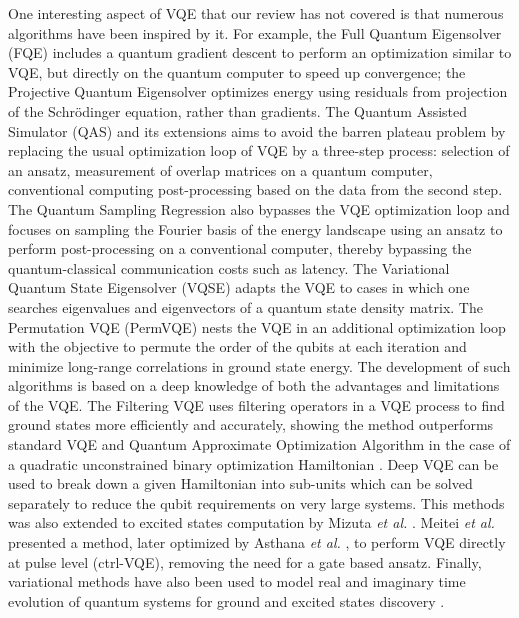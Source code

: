 \documentclass[a4paper,fleqn]{cas-sc}
\begin{document}
One interesting aspect of VQE that our review has not covered is that numerous algorithms have been inspired by it. For example, the Full Quantum Eigensolver \cite{Wei2020} (FQE) includes a quantum gradient descent to perform an optimization similar to VQE, but directly on the quantum computer to speed up convergence; the Projective Quantum Eigensolver \cite{Stair2021} optimizes energy using residuals from projection of the Schr\"odinger equation, rather than gradients. The Quantum Assisted Simulator (QAS) \cite{Bharti2020, Haug2020} and its extensions \cite{Bharti2020_IQAE} aims to avoid the barren plateau problem by replacing the usual optimization loop of VQE by a three-step process: selection of an ansatz, measurement of overlap matrices on a quantum computer, conventional computing post-processing based on the data from the second step. The Quantum Sampling Regression \cite{Rivero2020} also bypasses the VQE optimization loop and focuses on sampling the Fourier basis of the energy landscape using an ansatz to perform post-processing on a conventional computer, thereby bypassing the quantum-classical communication costs such as latency. The Variational Quantum State Eigensolver (VQSE) \cite{Cerezo2020_VQSE} adapts the VQE to cases in which one searches eigenvalues and eigenvectors of a quantum state density matrix. The Permutation VQE (PermVQE) \cite{Tkachenko2021} nests the VQE in an additional optimization loop with the objective to permute the order of the qubits at each iteration and minimize long-range correlations in ground state energy. The development of such algorithms is based on a deep knowledge of both the advantages and limitations of the VQE. The Filtering VQE \cite{Amaro2022} uses filtering operators in a VQE process to find ground states more efficiently and accurately, showing the method outperforms standard VQE and Quantum Approximate Optimization Algorithm in the case of a quadratic unconstrained binary optimization Hamiltonian \cite{Kochenberger2014}. Deep VQE \cite{Fujii2020} can be used to break down a given Hamiltonian into sub-units which can be solved separately to reduce the qubit requirements on very large systems. This methods was also extended to excited states computation by Mizuta \textit{et al.} \cite{Mizuta2021}. Meitei \textit{et al.} \cite{Meitei2021} presented a method, later optimized by Asthana \textit{et al.} \cite{Asthana2022}, to perform VQE directly at pulse level (ctrl-VQE), removing the need for a gate based ansatz. Finally, variational methods have also been used to model real and imaginary time evolution of quantum systems for ground and excited states discovery \cite{Yuan2019, Gustafson2021, Lin2021, Mansuroglu2021, McArdle2019, Nishi2021,Benedetti2021, Gomes2021}.
\end{document}
